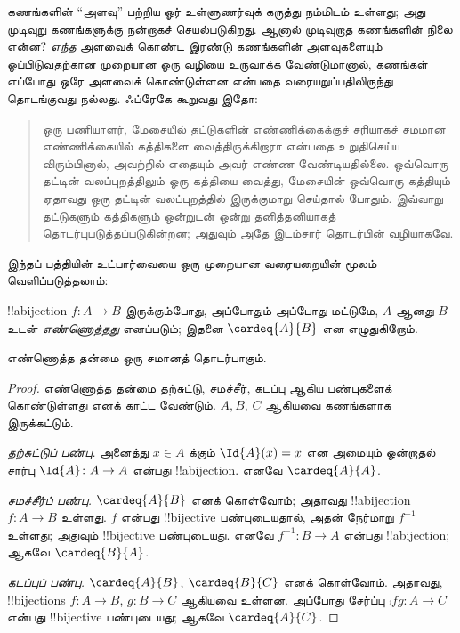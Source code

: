 \documentclass[../../../include/open-logic-section]{subfiles}
\begin{document}


கணங்களின் “அளவு” பற்றிய ஓர் உள்ளுணர்வுக் கருத்து நம்மிடம் உள்ளது;
அது முடிவுறு கணங்களுக்கு நன்றாகச் செயல்படுகிறது.
ஆனால் முடிவுறாத கணங்களின் நிலை என்ன?
\emph{எந்த} அளவைக் கொண்ட இரண்டு கணங்களின் அளவுகளையும் ஒப்பிடுவதற்கான
முறையான ஒரு வழியை உருவாக்க வேண்டுமானால்,
கணங்கள் எப்போது ஒரே அளவைக் கொண்டுள்ளன என்பதை வரையறுப்பதிலிருந்து
தொடங்குவது நல்லது. ஃப்ரேகே கூறுவது இதோ:
\begin{quote}
ஒரு பணியாளர், மேசையில் தட்டுகளின் எண்ணிக்கைக்குச் சரியாகச் சமமான
எண்ணிக்கையில் கத்திகளை வைத்திருக்கிறாரா என்பதை உறுதிசெய்ய விரும்பினால்,
அவற்றில் எதையும் அவர் எண்ண வேண்டியதில்லை.
ஒவ்வொரு தட்டின் வலப்புறத்திலும் ஒரு கத்தியை வைத்து,
மேசையின் ஒவ்வொரு கத்தியும் ஏதாவது ஒரு தட்டின் வலப்புறத்தில்
இருக்குமாறு செய்தால் போதும்.
இவ்வாறு தட்டுகளும் கத்திகளும் ஒன்றுடன் ஒன்று தனித்தனியாகத்
தொடர்புபடுத்தப்படுகின்றன; அதுவும் அதே இடம்சார் தொடர்பின் வழியாகவே.
\citep[\S70]{Frege1884}
\end{quote}
இந்தப் பத்தியின் உட்பார்வையை ஒரு முறையான வரையறையின் மூலம்
வெளிப்படுத்தலாம்:

\begin{defn}
!!a{bijection} $f \colon A \to B$ இருக்கும்போது,
அப்போதும் அப்போது மட்டுமே, $A$ ஆனது $B$ உடன்
\emph{எண்ணொத்தது} எனப்படும்; இதனை $\cardeq{A}{B}$ என எழுதுகிறோம்.
\end{defn}

\begin{prop}
எண்ணொத்த தன்மை ஒரு சமானத் தொடர்பாகும்.
\end{prop}

\begin{proof}
எண்ணொத்த தன்மை தற்சுட்டு, சமச்சீர், கடப்பு ஆகிய பண்புகளைக்
கொண்டுள்ளது எனக் காட்ட வேண்டும்.
$A, B$, $C$ ஆகியவை கணங்களாக இருக்கட்டும்.

\emph{தற்சுட்டுப் பண்பு.}
அனைத்து $x \in A$ க்கும் $\Id{A} (x) = x$ என அமையும்
ஒன்றாதல் சார்பு $\Id{A} \colon A \to A$ என்பது !!a{bijection}.
எனவே $\cardeq{A}{A}$.

\emph{சமச்சீர்ப் பண்பு.}
$\cardeq{A}{B}$ எனக் கொள்வோம்;
அதாவது !!a{bijection} $f\colon A \to B$ உள்ளது.
$f$ என்பது !!{bijective} பண்புடையதால்,
அதன் நேர்மாறு $f^{-1}$ உள்ளது; அதுவும் !!{bijective} பண்புடையது.
எனவே $f^{-1}\colon B \to A$ என்பது !!a{bijection};
ஆகவே $\cardeq{B}{A}$.

\emph{கடப்புப் பண்பு.}
$\cardeq{A}{B}$, $\cardeq{B}{C}$ எனக் கொள்வோம்.
அதாவது, !!{bijection}s $f\colon A \to B$,
$g\colon B \to
C$ ஆகியவை உள்ளன.
அப்போது சேர்ப்பு $\comp{f}{g}\colon A \to C$ என்பது
!!{bijective} பண்புடையது; ஆகவே $\cardeq{A}{C}$.
\end{proof}
\end{document}
